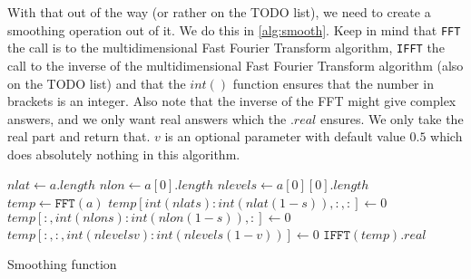 With that out of the way (or rather on the TODO list), we need to create a smoothing operation out of it. We do this in \autoref{alg:smooth}. Keep in mind that \texttt{FFT} the call is to the 
multidimensional Fast Fourier Transform algorithm, \texttt{IFFT} the call to the inverse of the multidimensional Fast Fourier Transform algorithm (also on the TODO list) and that the $int()$ 
function ensures that the number in brackets is an integer. Also note that the inverse of the FFT might give complex answers, and we only want real answers which the $.real$ ensures. We only 
take the real part and return that. $v$ is an optional parameter with default value $0.5$ which does absolutely nothing in this algorithm.

\begin{algorithm}
    $nlat \leftarrow a.length$ \;
    $nlon \leftarrow a[0].length$ \;
    $nlevels \leftarrow a[0][0].length$ \;
    $temp \leftarrow \texttt{FFT}(a)$ \;
    $temp[int(nlat s):int(nlat(1 - s)),:,:] \leftarrow 0$ \;
    $temp[:,int(nlon s):int(nlon(1 - s)),:] \leftarrow 0$ \;
    $temp[:,:,int(nlevels v):int(nlevels(1 - v))] \leftarrow 0$ \;
    \Return $\texttt{IFFT}(temp).real$ \;
    \caption{Smoothing function}
    \label{alg:smooth}
\end{algorithm}